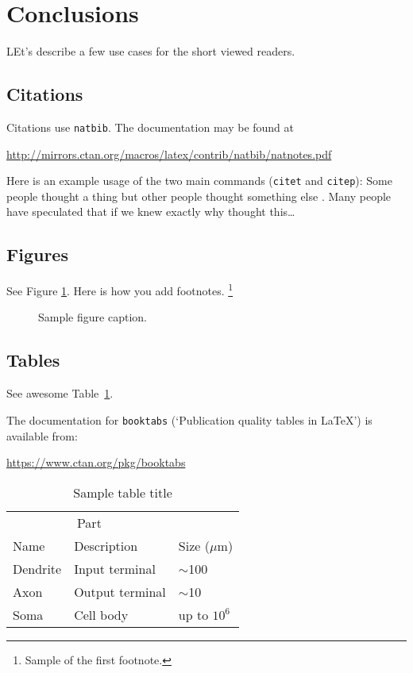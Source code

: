 \documentclass{article}
\begin{document}
\section{Conclusions}
LEt's describe a few use cases for the short viewed readers.

\subsection{Citations}
Citations use \verb+natbib+. The documentation may be found at
\begin{center}
	\url{http://mirrors.ctan.org/macros/latex/contrib/natbib/natnotes.pdf}
\end{center}

Here is an example usage of the two main commands (\verb+citet+ and \verb+citep+): Some people thought a thing \citep{kour2014real, hadash2018estimate} but other people thought something else \citep{kour2014fast}. Many people have speculated that if we knew exactly why \citet{kour2014fast} thought this\dots

\subsection{Figures}
\lipsum[10]
See Figure \ref{fig:fig1}. Here is how you add footnotes. \footnote{Sample of the first footnote.}
\lipsum[11]

\begin{figure}
	\centering
	\fbox{\rule[-.5cm]{4cm}{4cm} \rule[-.5cm]{4cm}{0cm}}
	\caption{Sample figure caption.}
	\label{fig:fig1}
\end{figure}

\subsection{Tables}
See awesome Table~\ref{tab:table}.

The documentation for \verb+booktabs+ (`Publication quality tables in LaTeX') is available from:
\begin{center}
	\url{https://www.ctan.org/pkg/booktabs}
\end{center}


\begin{table}
	\caption{Sample table title}
	\centering
	\begin{tabular}{lll}
		\toprule
		\multicolumn{2}{c}{Part}                   \\
		\cmidrule(r){1-2}
		Name     & Description     & Size ($\mu$m) \\
		\midrule
		Dendrite & Input terminal  & $\sim$100     \\
		Axon     & Output terminal & $\sim$10      \\
		Soma     & Cell body       & up to $10^6$  \\
		\bottomrule
	\end{tabular}
	\label{tab:table}
\end{table}
\end{document}
